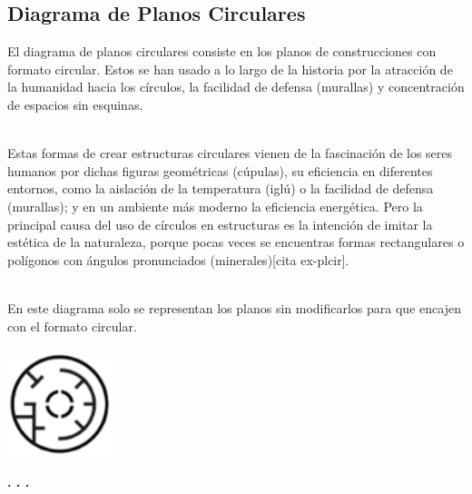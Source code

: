 \documentclass{article}\usepackage[]{graphicx}\usepackage[]{color}
\begin{document}
\subsection{Diagrama de Planos Circulares}
El diagrama de planos circulares consiste en los planos de construcciones con formato circular. Estos se han usado a lo largo de la historia por la atracci\'on de la humanidad hacia los c\'irculos, la facilidad de defensa (murallas) y concentraci\'on de espacios sin esquinas.~\\~\par
Estas formas de crear estructuras circulares vienen de la fascinaci\'on de los seres humanos por dichas figuras geom\'etricas (c\'upulas), su eficiencia en diferentes entornos, como la aislaci\'on de la temperatura (igl\'u) o la facilidad de defensa (murallas); y en un ambiente m\'as moderno la eficiencia energ\'etica. Pero la principal causa del uso de c\'irculos en estructuras es la intenci\'on de imitar la est\'etica de la naturaleza, porque pocas veces se encuentras formas rectangulares o pol\'igonos con \'angulos pronunciados (minerales)[cita ex-plcir].~\\~\par
En este diagrama solo se representan los planos sin modificarlos para que encajen con el formato circular.
~\\~\\
\vbox{
    \centering
    \includegraphics[width=0.23\textwidth]{imag/planos}
}
\begin{center}
\textbf{. . .}
\end{center}
\end{document}
